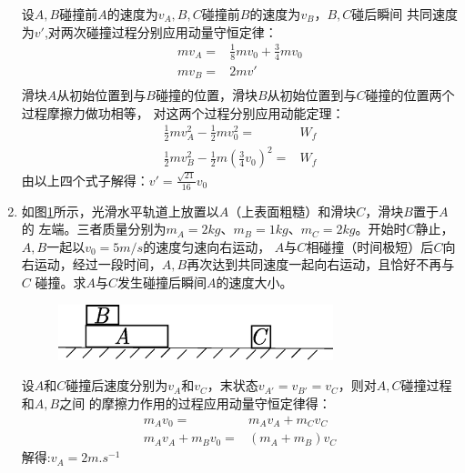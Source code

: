 \documentclass{article}
\begin{document}
\begin{enumerate}
设$A,B$碰撞前$A$的速度为$v_A,B,C$碰撞前$B$的速度为$v_B$，$B,C$碰后瞬间
共同速度为$v'$,对两次碰撞过程分别应用动量守恒定律：
\begin{align*}
mv_A=& \frac{1}{8}mv_0+\frac{3}{4}mv_0\\
mv_B=& 2mv'\\
\end{align*}
滑块$A$从初始位置到与$B$碰撞的位置，滑块$B$从初始位置到与$C$碰撞的位置两个过程摩擦力做功相等，
对这两个过程分别应用动能定理：
\begin{align*}
\frac{1}{2}mv_A^2-\frac{1}{2}mv_0^2=&W_f\\
\frac{1}{2}mv_B^2-\frac{1}{2}m\left(\frac{3}{4}v_0\right)^2=&W_f
\end{align*}
由以上四个式子解得：$v'=\frac{\sqrt{21}}{16}v_0$
\item 如图\ref{fig:2013momentum}所示，光滑水平轨道上放置以$A$（上表面粗糙）和滑块$C$，滑块$B$置于$A$的
左端。三者质量分别为$m_A=2\si{kg}、m_B=1\si{kg}、m_C=2\si{kg}$。开始时$C$静止，$A,B$一起以$v_0=5m/s$的速度匀速向右运动，
$A$与$C$相碰撞（时间极短）后$C$向右运动，经过一段时间，$A,B$再次达到共同速度一起向右运动，且恰好不再与$C$
碰撞。求$A$与$C$发生碰撞后瞬间$A$的速度大小。
\begin{figure}[!ht]
\centering
\includegraphics[width=8cm]{2013momentum.eps}
\caption{}\label{fig:2013momentum}
\end{figure}

设$A$和$C$碰撞后速度分别为$v_A$和$v_C$，末状态$v_{A'}=v_{B'}=v_C$，则对$A,C$碰撞过程和$A,B$之间
的摩擦力作用的过程应用动量守恒定律得：
\begin{align*}
m_A v_0 =& m_A v_A + m_C v_C\\
m_Av_A+m_Bv_0 =& (m_A+m_B)v_C
\end{align*}
解得:$v_A=2 \si{m.s^{-1}}$
\end{enumerate}
\end{document}
